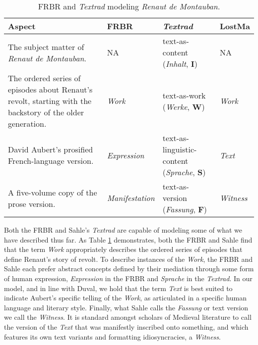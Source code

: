 \begin{table}[ht]
    \begin{center}
    \begin{tabular}{|p{}|p{}|p{}|p{}|}
        \hline
        \textbf{Aspect} & \textbf{FRBR} & \textbf{\textit{Textrad}} & \textbf{LostMa} \\ \hline
        The subject matter of \textit{Renaut de Montauban}. & NA & text-as-content \newline (\textit{Inhalt}, \textbf{I}) & NA \\ \hline
        The ordered series of episodes about Renaut's revolt, starting with the backstory of the older generation. & \textit{Work} & text-as-work \newline (\textit{Werke}, \textbf{W}) & \textit{Work} \\ \hline
        David Aubert's prosified French-language version. & \textit{Expression} & text-as-linguistic-content \newline (\textit{Sprache}, \textbf{S}) & \textit{Text} \\ \hline
        A five-volume copy of the prose version. & \textit{Manifestation} & text-as-version \newline (\textit{Fassung}, \textbf{F}) & \textit{Witness} \\ \hline
    \end{tabular}
    \end{center}
\caption{FRBR and \textit{Textrad} modeling \textit{Renaut de Montauban}.}
\label{tab:Renaut}
\end{table}

Both the FRBR and Sahle's \textit{Textrad} are capable of modeling some of what we have described thus far. As Table \ref{tab:Renaut} demonstrates, both the FRBR and Sahle find that the term \textit{Work} appropriately describes the ordered series of episodes that define Renaut's story of revolt. To describe instances of the \textit{Work}, the FRBR and Sahle each prefer abstract concepts defined by their mediation through some form of human expression, \textit{Expression} in the FRBR and \textit{Sprache} in the \textit{Textrad}. In our model, and in line with Duval, we hold that the term \textit{Text} is best suited to indicate Aubert's specific telling of the \textit{Work}, as articulated in a specific human language and literary style. Finally, what Sahle calls the \textit{Fassung} or text version we call the \textit{Witness}. It is standard amongst scholars of Medieval literature to call the version of the \textit{Text} that was manifestly inscribed onto something, and which features its own text variants and formatting idiosyncracies, a \textit{Witness}.

